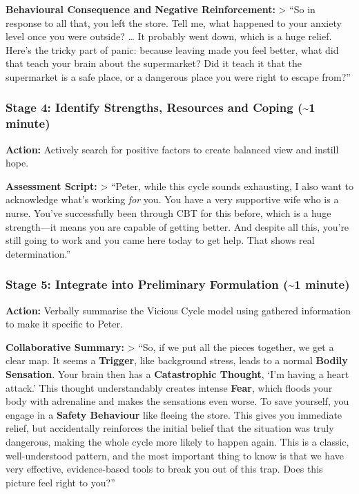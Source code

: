 \documentclass[
  american,
  letterpaper,
  DIV=11,
  numbers=noendperiod]{scrartcl}
\begin{document}
\textbf{Behavioural Consequence and Negative Reinforcement:}
\textgreater{} ``So in response to all that, you left the store. Tell
me, what happened to your anxiety level once you were outside? \ldots{}
It probably went down, which is a huge relief. Here's the tricky part of
panic: because leaving made you feel better, what did that teach your
brain about the supermarket? Did it teach it that the supermarket is a
safe place, or a dangerous place you were right to escape from?''

\subsubsection{Stage 4: Identify Strengths, Resources and Coping
(\textasciitilde1
minute)}\label{stage-4-identify-strengths-resources-and-coping-1-minute}

\textbf{Action:} Actively search for positive factors to create balanced
view and instill hope.

\textbf{Assessment Script:} \textgreater{} ``Peter, while this cycle
sounds exhausting, I also want to acknowledge what's working \emph{for}
you. You have a very supportive wife who is a nurse. You've successfully
been through CBT for this before, which is a huge strength---it means
you are capable of getting better. And despite all this, you're still
going to work and you came here today to get help. That shows real
determination.''

\subsubsection{Stage 5: Integrate into Preliminary Formulation
(\textasciitilde1
minute)}\label{stage-5-integrate-into-preliminary-formulation-1-minute}

\textbf{Action:} Verbally summarise the Vicious Cycle model using
gathered information to make it specific to Peter.

\textbf{Collaborative Summary:} \textgreater{} ``So, if we put all the
pieces together, we get a clear map. It seems a \textbf{Trigger}, like
background stress, leads to a normal \textbf{Bodily Sensation}. Your
brain then has a \textbf{Catastrophic Thought}, `I'm having a heart
attack.' This thought understandably creates intense \textbf{Fear},
which floods your body with adrenaline and makes the sensations even
worse. To save yourself, you engage in a \textbf{Safety Behaviour} like
fleeing the store. This gives you immediate relief, but accidentally
reinforces the initial belief that the situation was truly dangerous,
making the whole cycle more likely to happen again. This is a classic,
well-understood pattern, and the most important thing to know is that we
have very effective, evidence-based tools to break you out of this trap.
Does this picture feel right to you?''
\end{document}

